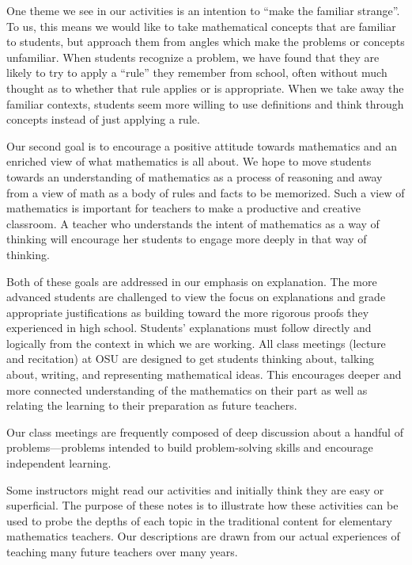 \documentclass[nooutcomes]{ximera}
\begin{document}
One theme we see in our activities is an intention to ``make the familiar strange''.  To us, this means 
we would like to take mathematical concepts that are familiar to students, but approach them from 
angles which make the problems or concepts unfamiliar.  When students recognize a problem, we have 
found that they are likely to try to apply a ``rule'' they remember from school, often 
without much thought as to whether that rule applies or is appropriate.  When we take away the 
familiar contexts, students seem more willing to use definitions and think through concepts instead
of just applying a rule.

Our second goal is to encourage a positive attitude towards mathematics and an enriched view 
of what mathematics is all about.  We hope to move students towards an understanding of mathematics
as a process of reasoning and away from a view of math as a body of 
rules and facts to be memorized. Such a view of mathematics is important for teachers to make a productive and 
creative classroom. A teacher who understands the intent of mathematics as a way of 
thinking will encourage her students to engage more deeply in that way of thinking.  

Both of these goals are addressed in our emphasis on explanation.  The more 
advanced students are challenged to view the focus on explanations and grade appropriate justifications as building toward the more rigorous proofs they experienced in high school.  
Students' explanations must follow directly and logically from the context in which we are working.  
All class meetings (lecture and recitation) at OSU are designed to get students thinking about, talking 
about, writing, and representing mathematical ideas.  This encourages deeper and more connected 
understanding of the mathematics on their part as well as relating the learning to their preparation as future teachers.  

Our class meetings are frequently composed of deep discussion about a handful of problems---problems intended to build problem-solving skills and encourage independent learning.  

Some instructors might read our activities and initially think they are easy or superficial.  The purpose of these notes is to illustrate how these activities can be used to probe the depths of each topic in the traditional content for elementary mathematics teachers.  Our descriptions are drawn from our actual experiences of teaching many future teachers over many years.
\end{document}
